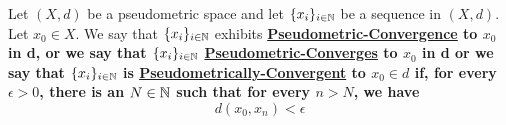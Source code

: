 \label{def:pseudometricsequenceconvergence}
\newcommand{\PseudometricConvergence}[0]{
    \bf \hyperref[def:pseudometricsequenceconvergence]{Pseudometric-Convergence} \rm
}
\newcommand{\PseudometricConvergent}[0]{
    \bf \hyperref[def:pseudometricsequenceconvergence]{Pseudometrically-Convergent} \rm
}
\newcommand{\PseudometricConverges}[0]{
    \bf \hyperref[def:pseudometricsequenceconvergence]{Pseudometric-Converges} \rm
}
\begin{df}
    Let $(X,d)$ be a pseudometric space and let $\{x_i\}_{i \in \mathbb{N}}$ be a sequence in $(X,d)$.
    Let $x_0 \in X$.  
    We say that $\{x_i\}_{i \in \mathbb{N}}$ exhibits \PseudometricConvergence to $x_0$ in d, or we say that $\{x_i\}_{i \in \mathbb{N}}$  \PseudometricConverges to $x_0$ in d or we say that $\{x_i\}_{i \in \mathbb{N}}$ is \PseudometricConvergent to $x_0 \in d$ if, 
    for every $\epsilon > 0$, there is an $N \in \mathbb{N}$ such that for every $n>N$, we have 
    \begin{equation}
        d(x_0, x_n) < \epsilon
    \end{equation}
\end{df}